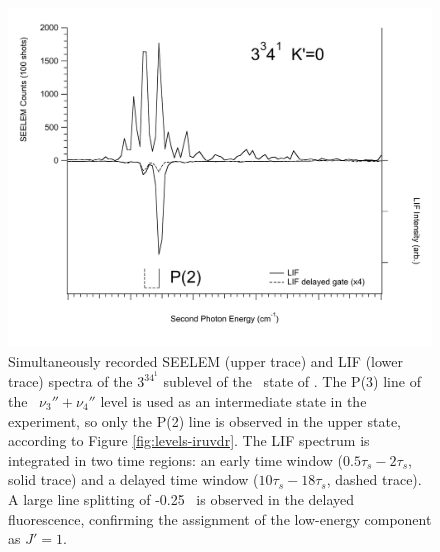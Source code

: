 \documentclass[12pt]{mitthesis}
\begin{document}
\begin{figure}
  \caption{Simultaneously recorded SEELEM (upper trace) and LIF (lower
    trace) spectra of the $3^34^1$  sublevel of the \astate\
    state of .  The P(3) line of the \xstate\ $\nu_3'' +
    \nu_4''$ level is used as an intermediate state in the experiment,
    so only the P(2) line is observed in the upper state, according to
    Figure \ref{fig:levels-iruvdr}.  The LIF spectrum is integrated in
    two time regions: an early time window ($0.5\tau_s-2\tau_s$, solid
    trace) and a delayed time window ($10\tau_s-18\tau_s$, dashed
    trace).  A large line splitting of -0.25 \rcm\ is observed in the
    delayed fluorescence, confirming the assignment of the low-energy
    component as $J'=1$.  \TODO{Calibration}}
  \label{fig:3341-p2}
  \centering
  \includegraphics[width=6in]{spectrum-3341-p2-primed.pdf}
\end{figure}

\end{document}
